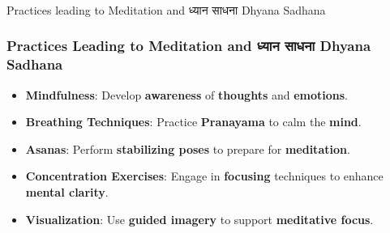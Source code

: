 \begin{frame}[fragile]\frametitle{}
\begin{center}
{\Large Practices leading to Meditation and ध्यान साधना  Dhyana Sadhana }
\end{center}
\end{frame}

\begin{frame}[fragile]\frametitle{Practices Leading to Meditation and ध्यान साधना  Dhyana Sadhana}

      \begin{itemize}
        \item \textbf{Mindfulness}: Develop \textbf{awareness} of \textbf{thoughts} and \textbf{emotions}.
        \item \textbf{Breathing Techniques}: Practice \textbf{Pranayama} to calm the \textbf{mind}.
        \item \textbf{Asanas}: Perform \textbf{stabilizing poses} to prepare for \textbf{meditation}.
        \item \textbf{Concentration Exercises}: Engage in \textbf{focusing} techniques to enhance \textbf{mental clarity}.
        \item \textbf{Visualization}: Use \textbf{guided imagery} to support \textbf{meditative focus}.
      \end{itemize}
 
\end{frame}








